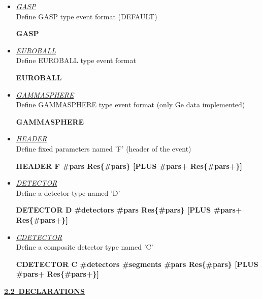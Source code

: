 \begin{itemize}

 \item 	{\it\underline{GASP}} \\
	{\sc Define GASP type event format (DEFAULT)} 

	\smallskip
	{\bf GASP} 

 \item 	{\it\underline{EUROBALL}} \\
	{\sc Define EUROBALL type event format}

	\smallskip
	{\bf EUROBALL} \\

 \item 	{\it\underline{GAMMASPHERE}} \\
	{\sc Define GAMMASPHERE type event format (only Ge data implemented)}

	\smallskip
	{\bf GAMMASPHERE} \\

 \item 	{\it\underline{HEADER}} \\
	{\sc Define fixed parameters named 'F' (header of the event)}

	\smallskip
	{\bf HEADER F \#pars  Res\{\#pars\} [PLUS \#pars+ Res\{\#pars+\}]} \\

 \item 	{\it\underline{DETECTOR}} \\
	{\sc Define a detector type named 'D'}

	\smallskip
	{\bf DETECTOR D \#detectors \#pars Res\{\#pars\} [PLUS \#pars+ 
	Res\{\#pars+\}]} \\

 \item 	{\it\underline{CDETECTOR}} \\
	{\sc Define a composite detector type named 'C'}

	\smallskip
	{\bf CDETECTOR C \#detectors \#segments \#pars Res\{\#pars\} 
	[PLUS \#pars+ Res\{\#pars+\}]} \\

\end{itemize}

\newpage
{\large\underline{\bf 2.2~DECLARATIONS}} \\


